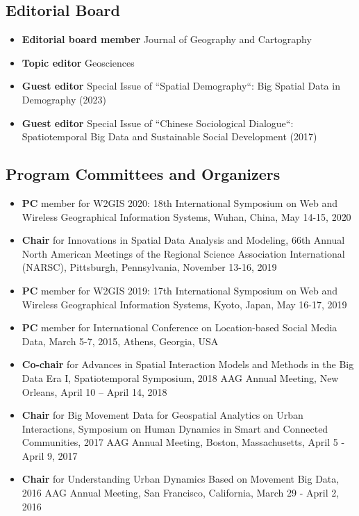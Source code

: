 \documentclass[11pt, a4paper]{article}
\begin{document}
\subsection*{Editorial Board}
\begin{itemize}
\item{\textbf{Editorial board member} Journal of Geography and Cartography}
\item{\textbf{Topic editor} Geosciences}
\item{\textbf{Guest editor} Special Issue of ``Spatial Demography``:  Big Spatial Data in Demography (2023)}
\item{\textbf{Guest editor} Special Issue of ``Chinese Sociological Dialogue``: Spatiotemporal Big Data and Sustainable Social Development (2017)}
\end{itemize}

\subsection*{Program Committees and Organizers}
\begin{itemize}
\item{\textbf{PC} member for W2GIS 2020: 18th International Symposium on Web and Wireless Geographical Information Systems, Wuhan, China, May 14-15, 2020}
\item{\textbf{Chair} for Innovations in Spatial Data Analysis and Modeling, 66th Annual North American Meetings of the Regional Science Association International (NARSC), Pittsburgh, Pennsylvania, November 13-16, 2019}
\item{\textbf{PC} member for W2GIS 2019: 17th International Symposium on Web and Wireless Geographical Information Systems, Kyoto, Japan, May 16-17, 2019}
\item{\textbf{PC} member for International Conference on Location-based Social Media Data, March 5-7, 2015, Athens, Georgia, USA}
\item{\textbf{Co-chair} for Advances in Spatial Interaction Models and Methods in the Big Data Era I, Spatiotemporal Symposium, 2018 AAG Annual Meeting, New Orleans, April 10 – April 14, 2018}
\item{\textbf{Chair} for Big Movement Data for Geospatial Analytics on Urban Interactions, Symposium on Human Dynamics in Smart and Connected Communities, 2017 AAG Annual Meeting, Boston, Massachusetts, April 5 - April 9, 2017}
\item{\textbf{Chair} for Understanding Urban Dynamics Based on Movement Big Data, 2016 AAG Annual Meeting, San Francisco, California, March 29 - April 2, 2016}
\end{itemize}
\end{document}

